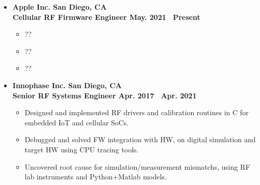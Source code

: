 \documentclass[10pt, letterpaper]{letter}
\begin{document}
\begin{itemize}[label=$\bullet$, leftmargin=1em]

    \item
    \textbf{Apple Inc. \hfill San Diego, CA}\vspace{2pt}\\
    \textbf{Cellular RF Firmware Engineer \hfill May. 2021 \textendash\ Present}\vspace{2pt}
    \begin{itemize}[nosep, leftmargin=1.15em]
        \item ??
        \item ??
        \item ??
    \end{itemize}

\vfill

    \item
    \textbf{Innophase Inc. \hfill San Diego, CA}\vspace{2pt}\\
    \textbf{Senior RF Systems Engineer \hfill Apr. 2017 \textendash\ Apr. 2021}\vspace{2pt}
    \begin{itemize}[nosep, leftmargin=1.15em]
        \item Designed and implemented RF drivers and calibration routines in C for embedded IoT and cellular SoCs.
        \item Debugged and solved FW integration with HW, on digital simulation and target HW using CPU tracing tools.
        \item Uncovered root cause for simulation/measurement mismatchs, using RF lab instruments and Python+Matlab models.
    \end{itemize}

\vfill


\end{itemize}
\end{document}
